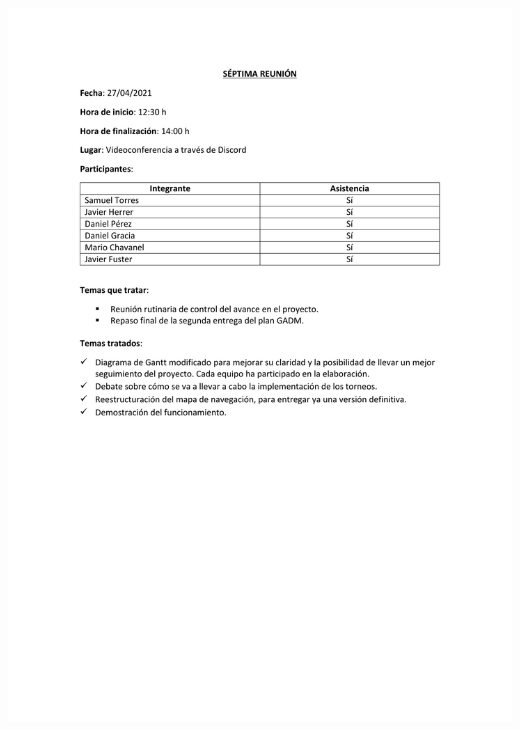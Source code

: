 \documentclass{article}
\begin{document}
\includegraphics[width=\textwidth]{../images/actas/Acta_reunion_7.pdf}
\end{document}
